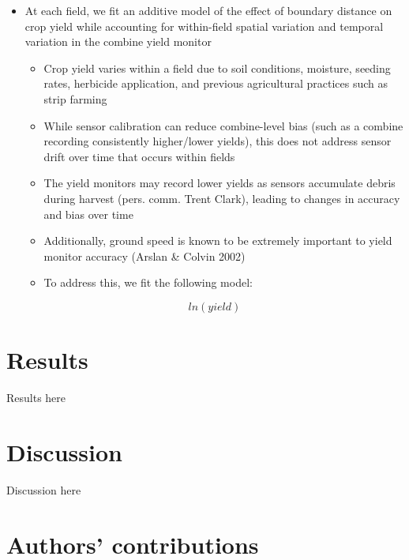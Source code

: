 \documentclass[]{elsarticle} %
\providecommand{\tightlist}{%
  \setlength{\itemsep}{0pt}\setlength{\parskip}{0pt}}
\begin{document}
\begin{itemize}
\tightlist
\item
  At each field, we fit an additive model of the effect of boundary distance on crop yield while accounting for within-field spatial variation and temporal variation in the combine yield monitor

  \begin{itemize}
  \tightlist
  \item
    Crop yield varies within a field due to soil conditions, moisture, seeding rates, herbicide application, and previous agricultural practices such as strip farming
  \item
    While sensor calibration can reduce combine-level bias (such as a combine recording consistently higher/lower yields), this does not address sensor drift over time that occurs within fields
  \item
    The yield monitors may record lower yields as sensors accumulate debris during harvest (pers. comm. Trent Clark), leading to changes in accuracy and bias over time
  \item
    Additionally, ground speed is known to be extremely important to yield monitor accuracy (Arslan \& Colvin 2002)
  \item
    To address this, we fit the following model:
  \end{itemize}

  \begin{equation}
  ln(yield) 
  \end{equation}
\end{itemize}

\hypertarget{results}{%
\section{Results}\label{results}}

Results here

\hypertarget{discussion}{%
\section{Discussion}\label{discussion}}

Discussion here

\hypertarget{authors-contributions}{%
\section{Authors' contributions}\label{authors-contributions}}
\end{document}
